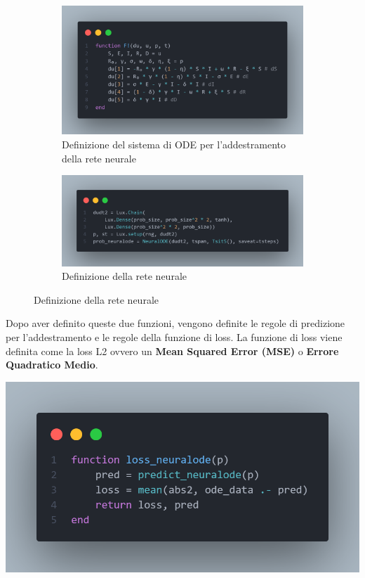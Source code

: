 \begin{figure}[!hb]
	\centering
	\begin{subfigure}[b]{0.45\textwidth}
		\centering
		\includegraphics[width=\textwidth]{img/seir_function.png}
		\caption{Definizione del sistema di ODE per l'addestramento della rete neurale}
		\label{fig:seir_function}
	\end{subfigure}
	\hfill
	\begin{subfigure}[b]{0.45\textwidth}
		\centering
		\includegraphics[width=\textwidth]{img/neural_ode.png}
		\caption{Definizione della rete neurale}
		\label{fig:neural_ode}
	\end{subfigure}
\end{figure}

Dopo aver definito queste due funzioni, vengono definite le regole di predizione
per l'addestramento e le regole della funzione di loss. La funzione di loss viene definita 
come la loss L2 ovvero un \textbf{Mean Squared Error (MSE)} o \textbf{Errore Quadratico Medio}.

\begin{minipage}{\linewidth}
	\centering
	\includegraphics[width=\textwidth]{img/loss.png}
	\label{fig:loss_function}
\end{minipage}

